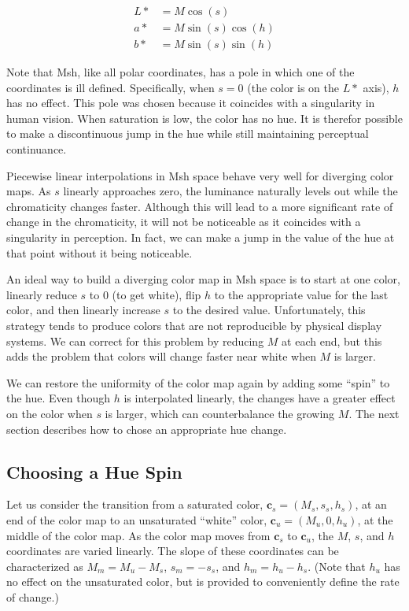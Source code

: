 \documentclass{vgtc}                          %
\newcommand{\Msh}{Msh\xspace}
\newcommand*{\cvec}[1]{\mathbf{#1}}
\begin{document}
\begin{equation}
  \begin{split}
    L* &= M \cos\left(s\right) \\
    a* &= M \sin\left(s\right) \cos\left(h\right) \\
    b* &= M \sin\left(s\right) \sin\left(h\right)
  \end{split}
\end{equation}

Note that \Msh, like all polar coordinates, has a pole in which one of the
coordinates is ill defined.  Specifically, when $s = 0$ (the color is on
the $L*$ axis), $h$ has no effect.  This pole was chosen because it
coincides with a singularity in human vision.  When saturation is low, the
color has no hue.  It is therefor possible to make a discontinuous jump
in the hue while still maintaining perceptual continuance.

Piecewise linear interpolations in \Msh space behave very well for
diverging color maps.  As $s$ linearly approaches zero, the luminance
naturally levels out while the chromaticity changes faster.  Although this
will lead to a more significant rate of change in the chromaticity, it will
not be noticeable as it coincides with a singularity in perception.  In
fact, we can make a jump in the value of the hue at that point without it
being noticeable.

An ideal way to build a diverging color map in \Msh space is to start at
one color, linearly reduce $s$ to 0 (to get white), flip $h$ to the
appropriate value for the last color, and then linearly increase $s$ to the
desired value.  Unfortunately, this strategy tends to produce colors that
are not reproducible by physical display systems.  We can correct for this
problem by reducing $M$ at each end, but this adds the problem that colors
will change faster near white when $M$ is larger.

We can restore the uniformity of the color map again by adding some
``spin'' to the hue.  Even though $h$ is interpolated linearly, the changes
have a greater effect on the color when $s$ is larger, which can
counterbalance the growing $M$.  The next section describes how to chose an
appropriate hue change.

\subsection{Choosing a Hue Spin}
\label{sec:ChoosingAHueSpin}

Let us consider the transition from a saturated color, $\cvec{c}_s=(M_s,
s_s, h_s)$, at an end of the color map to an unsaturated ``white'' color,
$\cvec{c}_u=(M_u, 0, h_u)$, at the middle of the color map.  As the
color map moves from $\cvec{c}_s$ to $\cvec{c}_u$, the $M$, $s$, and $h$
coordinates are varied linearly.  The slope of these coordinates can be
characterized as $M_m = M_u - M_s$, $s_m = -s_s$, and $h_m = h_u - h_s$.
(Note that $h_u$ has no effect on the unsaturated color, but is provided to
conveniently define the rate of change.)
\end{document}
